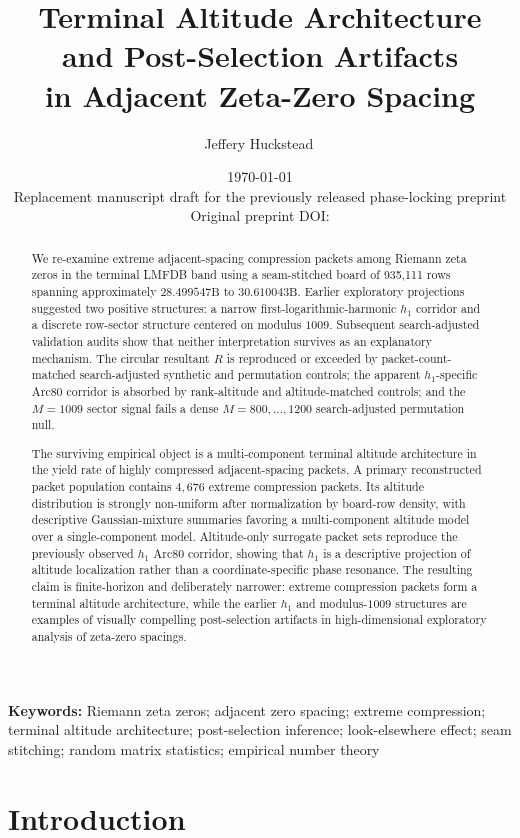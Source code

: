 \documentclass[11pt]{article}
\title{\textbf{Terminal Altitude Architecture and Post-Selection Artifacts}\\
\textbf{in Adjacent Zeta-Zero Spacing}}
\author[1]{Jeffery Huckstead\,\orcidlink{0009-0007-0234-2177}}
\affil[1]{Independent Researcher}
\date{\today\\
Replacement manuscript draft for the previously released phase-locking preprint\\
Original preprint DOI: \href{https://doi.org/\priorpreprintdoi}{\priorpreprintdoi}}
\newcommand{\terminalrows}{935{,}111}
\newcommand{\terminalmin}{28.499547\mathrm{B}}
\newcommand{\terminalmax}{30.610043\mathrm{B}}
\newcommand{\primarypackets}{4{,}676}
\begin{document}
\maketitle

\begin{abstract}
We re-examine extreme adjacent-spacing compression packets among Riemann zeta zeros in the terminal LMFDB band using a seam-stitched board of \terminalrows{} rows spanning approximately \(\terminalmin\) to \(\terminalmax\). Earlier exploratory projections suggested two positive structures: a narrow first-logarithmic-harmonic \(h_1\) corridor and a discrete row-sector structure centered on modulus \(1009\). Subsequent search-adjusted validation audits show that neither interpretation survives as an explanatory mechanism. The circular resultant \(R\) is reproduced or exceeded by packet-count-matched search-adjusted synthetic and permutation controls; the apparent \(h_1\)-specific Arc80 corridor is absorbed by rank-altitude and altitude-matched controls; and the \(M=1009\) sector signal fails a dense \(M=800,\ldots,1200\) search-adjusted permutation null.

The surviving empirical object is a multi-component terminal altitude architecture in the yield rate of highly compressed adjacent-spacing packets. A primary reconstructed packet population contains \(\primarypackets\) extreme compression packets. Its altitude distribution is strongly non-uniform after normalization by board-row density, with descriptive Gaussian-mixture summaries favoring a multi-component altitude model over a single-component model. Altitude-only surrogate packet sets reproduce the previously observed \(h_1\) Arc80 corridor, showing that \(h_1\) is a descriptive projection of altitude localization rather than a coordinate-specific phase resonance. The resulting claim is finite-horizon and deliberately narrower: extreme compression packets form a terminal altitude architecture, while the earlier \(h_1\) and modulus-\(1009\) structures are examples of visually compelling post-selection artifacts in high-dimensional exploratory analysis of zeta-zero spacings.
\end{abstract}

\noindent\textbf{Keywords:} Riemann zeta zeros; adjacent zero spacing; extreme compression; terminal altitude architecture; post-selection inference; look-elsewhere effect; seam stitching; random matrix statistics; empirical number theory

\section{Introduction}
\end{document}
